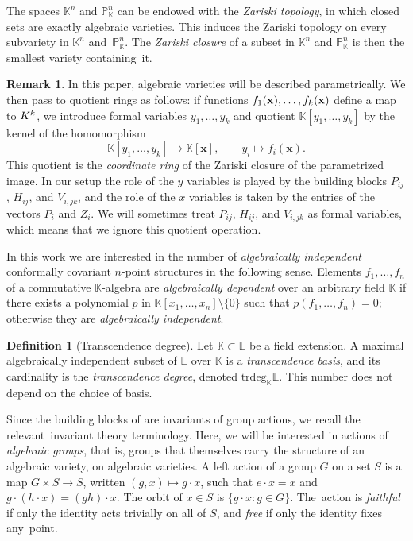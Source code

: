 \documentclass[12pt,a4paper]{extarticle}
\theoremstyle{definition}
\newtheorem{definition}[theorem]{Definition}
\newtheorem{remark}[theorem]{Remark}
\newcommand{\K}{\mathbb{K}}
\begin{document}
The spaces $\mathbb{K}^n$ and $\mathbb{P}^n_{\mathbb{K}}$ can be endowed with the \emph{Zariski topology}, in which closed sets
are exactly algebraic varieties. This induces the Zariski topology on every subvariety in $\mathbb{K}^n$ and~$\mathbb{P}^n_{\mathbb{K}}$. The \emph{Zariski closure} of a subset in $\mathbb{K}^n$ and $\mathbb{P}^n_{\mathbb{K}}$ is then the
smallest variety containing~it.
\begin{remark}\label{rem: functions as formal vars}
    In this paper, algebraic varieties will  be described parametrically. We then pass to quotient rings as follows: if functions $f_1({\bf x}),\ldots,f_k({\bf x})$ define a  map to $\mathbb \K^k$, we introduce formal variables $y_1,\ldots,y_k$ and quotient $\mathbb K[y_1,\ldots,y_k]$ by the kernel of the homomorphism
$$
\mathbb K[y_1,\ldots,y_k]\rightarrow \mathbb K[\mathbf x],
\qquad
y_i\mapsto f_i(\mathbf{x}).
$$
This quotient is the \emph{coordinate ring} of the Zariski closure of the parametrized image. In our setup the role of the $y$ variables is played by the building blocks $P_{ij}$, $H_{ij}$, and $V_{i,jk}$, and the role of the $x$ variables is taken by the entries of the vectors $P_i$ and $Z_i$. We will sometimes treat $P_{ij}$, $H_{ij}$, and $V_{i,jk}$ as formal variables, which means that we ignore this quotient operation.
\end{remark}
In this work we are interested in the number of \emph{algebraically independent} conformally covariant $n$-point structures in the following sense. Elements
$f_1,\ldots,f_n$ of a commutative $\mathbb{K}$-algebra are
\emph{algebraically dependent} over an arbitrary field $\mathbb{K}$ if there exists a
polynomial $p$ in $\mathbb{K}[x_1,\ldots,x_n]\setminus\{0\}$ such that
$p(f_1,\ldots,f_n)=0$; otherwise they are \emph{algebraically independent}.
\begin{definition}[Transcendence degree] \label{def: trdeg}
    Let $\mathbb{K} \subset \mathbb{L}$ be a field extension. 
    A maximal algebraically
independent subset of $\mathbb{L}$ over $\mathbb{K}$ is a
\emph{transcendence basis}, and its cardinality is the
\emph{transcendence degree}, denoted
$\mathrm{trdeg}_{\mathbb{K}}\mathbb{L}$. This number does not depend on the choice of basis. 
\end{definition}

Since the 
building blocks of \cite{CPPR} are invariants of group
actions, we recall the relevant~invariant theory terminology. Here, we will be interested in actions of \emph{algebraic groups}, that is, groups that themselves carry the structure of an algebraic variety, on algebraic varieties.
A left action of a group $G$ on a set $S$
is a map $G\times S\to S$, written $(g,x)\mapsto g\cdot x$, such that
$e\cdot x=x$ and $g\cdot(h\cdot x)=(gh)\cdot x$. The orbit of $x\in S$ is
$\{g\cdot x:g\in G\}$. The~action is \emph{faithful} if only the identity acts
trivially on all of $S$, and \emph{free} if only the identity fixes any~point.
\end{document}
